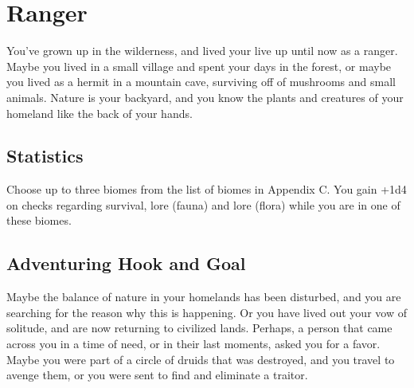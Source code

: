 \section{Ranger}\label{background:ranger}
You've grown up in the wilderness, and lived your live up until now as a ranger.
Maybe you lived in a small village and spent your days in the forest, or maybe you lived as a hermit in a mountain cave, surviving off of mushrooms and small animals.
Nature is your backyard, and you know the plants and creatures of your homeland like the back of your hands.

\subsection{Statistics}
Choose up to three biomes from the list of biomes in Appendix C.
You gain +1d4 on checks regarding survival, lore (fauna) and lore (flora) while you are in one of these biomes.

\subsection{Adventuring Hook and Goal}
Maybe the balance of nature in your homelands has been disturbed, and you are searching for the reason why this is happening.
Or you have lived out your vow of solitude, and are now returning to civilized lands.
Perhaps, a person that came across you in a time of need, or in their last moments, asked you for a favor.
Maybe you were part of a circle of druids that was destroyed, and you travel to avenge them, or you were sent to find and eliminate a traitor.
